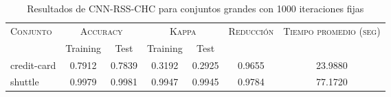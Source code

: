 \begin{table}[]
\centering
\begin{tabular}{l c c c c c c}
\hline
\multirow{2}{*}{\textsc{Conjunto}}
	& \multicolumn{2}{c}{\textsc{Accuracy}}
	& \multicolumn{2}{c}{\textsc{Kappa}}
	& \textsc{Reducción}
	& \textsc{Tiempo promedio (seg)} \\
	& Training & Test
	& Training & Test \\ 
\hline
\hline

credit-card & 0.7912 & 0.7839 & 0.3192 & 0.2925 & 0.9655 & 23.9880 \\
shuttle & 0.9979 & 0.9981 & 0.9947 & 0.9945 & 0.9784 & 77.1720 \\

\hline
\end{tabular}
\caption{Resultados de CNN-RSS-CHC para conjuntos grandes con 1000 iteraciones fijas}
\label{res-grande-CNN-RSS-CHC}
\end{table}

